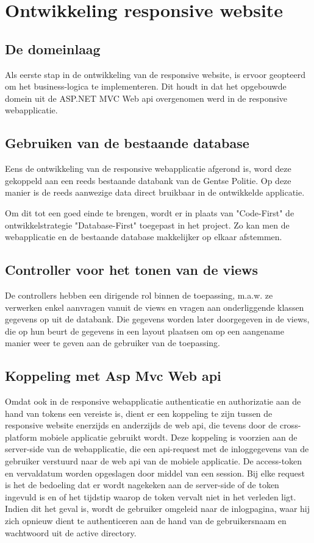 \chapter{Ontwikkeling responsive website}
\label{ch:ontwikkelingresponsivewebsite}
\section{De domeinlaag}
Als eerste stap in de ontwikkeling van de responsive website, is ervoor geopteerd om het business-logica te implementeren.
Dit houdt in dat het opgebouwde domein uit de ASP.NET MVC Web api overgenomen werd in de responsive webapplicatie.

\section{Gebruiken van de bestaande database}
Eens de ontwikkeling van de responsive webapplicatie afgerond is, word deze gekoppeld aan een reeds bestaande databank van de Gentse Politie.
Op deze manier is de reeds aanwezige data direct bruikbaar in de ontwikkelde applicatie.

Om dit tot een goed einde te brengen, wordt er in plaats van "Code-First" de ontwikkelstrategie "Database-First" toegepast in het project.
Zo kan men de webapplicatie en de bestaande database makkelijker op elkaar afstemmen.

\section{Controller voor het tonen van de views}
De controllers hebben een dirigende rol binnen de toepassing, m.a.w. ze verwerken enkel aanvragen vanuit de views en vragen aan onderliggende
klassen gegevens op uit de databank. Die gegevens worden later doorgegeven in de views, die op hun beurt de gegevens in een layout plaatsen om
op een aangename manier weer te geven aan de gebruiker van de toepassing.

\section{Koppeling met Asp Mvc Web api}
Omdat ook in de responsive webapplicatie authenticatie en authorizatie aan de hand van tokens een vereiste is,
dient er een koppeling te zijn tussen de responsive website enerzijds en anderzijds de web api, die tevens door de cross-platform
mobiele applicatie gebruikt wordt. Deze koppeling is voorzien aan de server-side van de webapplicatie, die een api-request met
de inloggegevens van de gebruiker verstuurd naar de web api van de mobiele applicatie. De access-token en vervaldatum worden
opgeslagen door middel van een session. Bij elke request is het de bedoeling dat er wordt nagekeken aan de server-side of
de token ingevuld is en of het tijdstip waarop de token vervalt niet in het verleden ligt. Indien dit het geval is, wordt
de gebruiker omgeleid naar de inlogpagina, waar hij zich opnieuw dient te authenticeren aan de hand van de gebruikersnaam en
wachtwoord uit de active directory.

